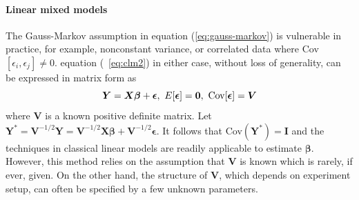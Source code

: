 \paragraph{Linear mixed models}\label{para:lmm}
The Gauss-Markov assumption in equation (\ref{eq:gauss-markov}) is vulnerable in practice, for
example, nonconstant variance, or correlated data where Cov$[\epsilon_i, \epsilon_j]\neq 0$.
equation (~\ref{eq:clm2}) in either case, without loss of generality, can be expressed in matrix
form as
\begin{equation}\label{eq:clm3}
	\bm Y = \bm {X\beta} + \bm \epsilon, ~ E[\bm \epsilon] = \bm 0, ~\text{Cov}[\bm\epsilon] = \bm V
\end{equation}
where $\bm V$ is a known positive definite matrix. Let $\bm Y^{\ast} = \bm V^{-1/2}\bm Y = \bm
V^{-1/2}\bm {X\beta} + \bm V^{-1/2}\bm \epsilon$. It follows that Cov$(\bm Y^{\ast})= \bm I$ and the
techniques in classical linear models are readily applicable to estimate $\bm \beta$. However, this
method relies on the assumption that $\bm V$ is known which is rarely, if ever, given. On the other
hand, the structure of $\bm V$, which depends on experiment setup, can often be specified by a few
unknown parameters. 

